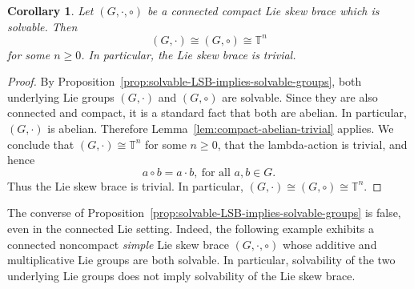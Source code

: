 \documentclass[reqno]{amsart}
\newtheorem{corollary}[theorem]{Corollary}
\begin{document}
\begin{corollary}\label{cor:compact-solvable-LSB-torus}
Let \((G,\cdot,\circ)\) be a connected compact Lie skew brace which is
solvable. Then
\[
(G,\cdot)\cong (G,\circ)\cong \mathbb T^n
\]
for some \(n\ge 0\). In particular, the Lie skew brace is trivial.
\end{corollary}

\begin{proof}
By Proposition~\ref{prop:solvable-LSB-implies-solvable-groups}, both underlying
Lie groups \((G,\cdot)\) and \((G,\circ)\) are solvable. Since they are also
connected and compact, it is a standard fact that both are abelian. In
particular, \((G,\cdot)\) is abelian. Therefore
Lemma~\ref{lem:compact-abelian-trivial} applies. We conclude that
$(G,\cdot)\cong \mathbb{T}^n$
for some \(n\ge 0\), that the lambda-action is trivial, and hence
\[
a\circ b=a\cdot b, \ 
\text{for all }a,b\in G.
\]
Thus the Lie skew brace is trivial. In particular,
$(G,\cdot)\cong (G,\circ)\cong \mathbb{T}^n$.
\end{proof}

The converse of Proposition~\ref{prop:solvable-LSB-implies-solvable-groups} is
false, even in the connected Lie setting. Indeed, the following example
exhibits a connected noncompact \emph{simple} Lie skew brace
\((G,\cdot,\circ)\) whose additive and multiplicative Lie groups are both
solvable. In particular, solvability of the two underlying Lie groups does not
imply solvability of the Lie skew brace.
\end{document}
